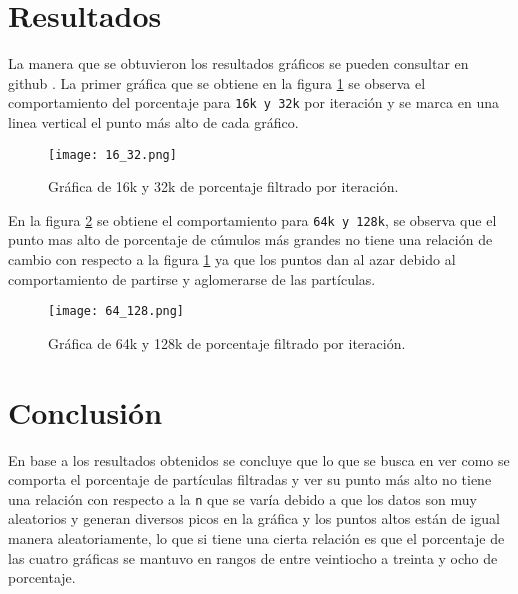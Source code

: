 \documentclass[a4paper, 11pt]{article}
\begin{document}
\section{Resultados}
La manera que se obtuvieron los resultados gráficos se pueden consultar en github \citep{Edson}. La primer gráfica que se obtiene en la figura \ref{f1} se observa el comportamiento del porcentaje para \texttt{16k y 32k} por iteración y se marca en una linea vertical el punto más alto de cada gráfico. 

\begin{figure}[H]
  \centering      
  \texttt{[image: 16\_32.png]}
  \caption{Gráfica de 16k y 32k de porcentaje filtrado por iteración.}
  \label{f1}
\end{figure}
\bigskip

En la figura \ref{f2} se obtiene el comportamiento para \texttt{64k y 128k}, se observa que el punto mas alto de porcentaje de cúmulos más grandes no tiene una relación de cambio con respecto a la figura \ref{f1} ya que los puntos dan al azar debido al comportamiento de partirse y aglomerarse de las partículas. 

\begin{figure}[H]
  \centering      
  \texttt{[image: 64\_128.png]}
  \caption{Gráfica de 64k y 128k de porcentaje filtrado por iteración.}
  \label{f2}
\end{figure}
\bigskip

\section{Conclusión}
En base a los resultados obtenidos se concluye que lo que se busca en ver como se comporta el porcentaje de partículas filtradas y ver su punto más alto no tiene una relación con respecto a la \texttt{n} que se varía debido a que los datos son muy aleatorios y generan diversos picos en la gráfica y los puntos altos están de igual manera aleatoriamente, lo que si tiene una cierta relación es que el porcentaje de las cuatro gráficas se mantuvo en rangos de entre veintiocho a treinta y ocho de porcentaje.



\end{document}
